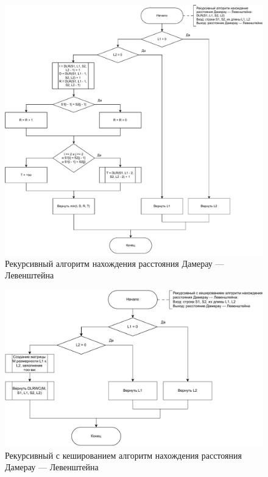 \begin{figure}[H]
	\centering
	\includegraphics[scale=0.55]{img/dlev_rec.pdf}
	\caption{Рекурсивный алгоритм нахождения расстояния Дамерау --- Левенштейна}
	\label{fig:dlrec}
\end{figure}

\begin{figure}[H]
	\centering
	\includegraphics[scale=0.55]{img/dlev_rwc.pdf}
	\caption{Рекурсивный с кешированием алгоритм нахождения расстояния Дамерау --- Левенштейна}
	\label{fig:dlrwc}
\end{figure}

\newpage

